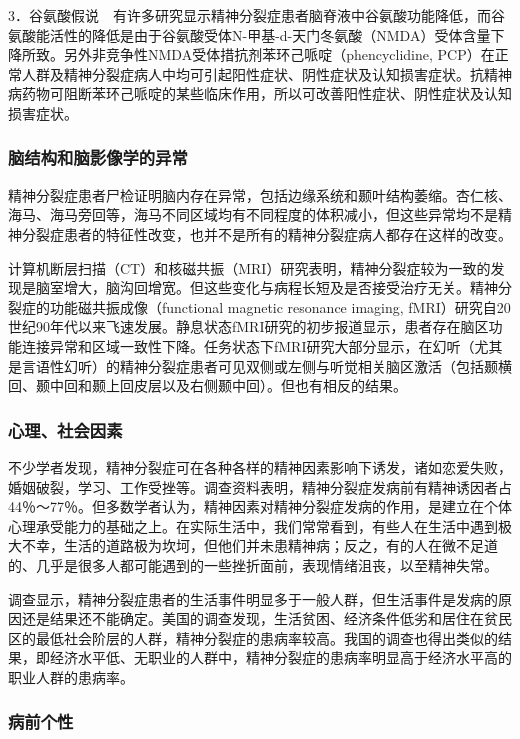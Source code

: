 3．谷氨酸假说　有许多研究显示精神分裂症患者脑脊液中谷氨酸功能降低，而谷氨酸能活性的降低是由于谷氨酸受体N-甲基-d-天门冬氨酸（NMDA）受体含量下降所致。另外非竞争性NMDA受体措抗剂苯环己哌啶（phencyclidine,
PCP）在正常人群及精神分裂症病人中均可引起阳性症状、阴性症状及认知损害症状。抗精神病药物可阻断苯环己哌啶的某些临床作用，所以可改善阳性症状、阴性症状及认知损害症状。

\subsubsection{脑结构和脑影像学的异常}

精神分裂症患者尸检证明脑内存在异常，包括边缘系统和颞叶结构萎缩。杏仁核、海马、海马旁回等，海马不同区域均有不同程度的体积减小，但这些异常均不是精神分裂症患者的特征性改变，也并不是所有的精神分裂症病人都存在这样的改变。

计算机断层扫描（CT）和核磁共振（MRI）研究表明，精神分裂症较为一致的发现是脑室增大，脑沟回增宽。但这些变化与病程长短及是否接受治疗无关。精神分裂症的功能磁共振成像（functional
magnetic resonance imaging,
fMRI）研究自20世纪90年代以来飞速发展。静息状态fMRI研究的初步报道显示，患者存在脑区功能连接异常和区域一致性下降。任务状态下fMRI研究大部分显示，在幻听（尤其是言语性幻听）的精神分裂症患者可见双侧或左侧与听觉相关脑区激活（包括颞横回、颞中回和颞上回皮层以及右侧颞中回）。但也有相反的结果。

\subsubsection{心理、社会因素}

不少学者发现，精神分裂症可在各种各样的精神因素影响下诱发，诸如恋爱失败，婚姻破裂，学习、工作受挫等。调查资料表明，精神分裂症发病前有精神诱因者占44％～77％。但多数学者认为，精神因素对精神分裂症发病的作用，是建立在个体心理承受能力的基础之上。在实际生活中，我们常常看到，有些人在生活中遇到极大不幸，生活的道路极为坎坷，但他们并未患精神病；反之，有的人在微不足道的、几乎是很多人都可能遇到的一些挫折面前，表现情绪沮丧，以至精神失常。

调查显示，精神分裂症患者的生活事件明显多于一般人群，但生活事件是发病的原因还是结果还不能确定。美国的调查发现，生活贫困、经济条件低劣和居住在贫民区的最低社会阶层的人群，精神分裂症的患病率较高。我国的调查也得出类似的结果，即经济水平低、无职业的人群中，精神分裂症的患病率明显高于经济水平高的职业人群的患病率。

\subsubsection{病前个性}

